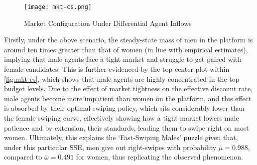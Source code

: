 \begin{figure}[ht]
    \centering
    \caption{Market Configuration Under Differential Agent Inflows}
    \texttt{[image: mkt-cs.png]}
    \label{fig:mkt-cs} 
\end{figure} 

Firstly, under the above scenario, the steady-state mass of men in the platform is around ten times greater than that of women (in line with empirical estimates), implying that male agents face a tight market and struggle to get paired with female candidates. 
This is further evidenced by the top-center plot within \autoref{fig:mkt-cs}, which shows that male agents are highly concentrated in the top budget levels. 
Due to the effect of market tightness on the effective discount rate, male agents become more impatient than women on the platform, and this effect is absorbed by their optimal swiping policy, which sits considerably lower than the female swiping curve, effectively showing how a tight market lowers male patience and by extension, their standards, leading them to swipe right on most women. 
Ultimately, this explains the `Fast-Swiping Males' puzzle given that, under this particular SSE, men give out right-swipes with probability $\overline\mu=0.988$, compared to $\overline\omega=0.491$ for women, thus replicating the observed phenomenon.